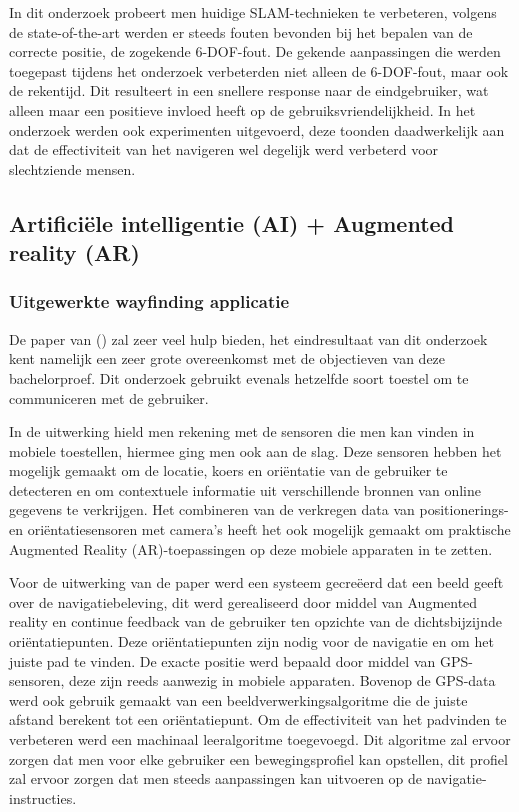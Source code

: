 In dit onderzoek probeert men huidige SLAM-technieken te verbeteren, volgens de state-of-the-art werden er steeds fouten bevonden bij het bepalen van de correcte positie, de zogekende 6-DOF-fout. De gekende aanpassingen die werden toegepast tijdens het onderzoek verbeterden niet alleen de 6-DOF-fout, maar ook de rekentijd. Dit resulteert in een snellere response naar de eindgebruiker, wat alleen maar een positieve invloed heeft op de gebruiksvriendelijkheid. In het onderzoek werden ook experimenten uitgevoerd, deze toonden daadwerkelijk aan dat de effectiviteit van het navigeren wel degelijk werd verbeterd voor slechtziende mensen.

\subsection{Artificiële intelligentie (AI) + Augmented reality (AR)}
\subsubsection{Uitgewerkte wayfinding applicatie}
De paper van \textcite{Pouria2016} () zal zeer veel hulp bieden, het eindresultaat van dit onderzoek kent namelijk een zeer grote overeenkomst met de objectieven van deze bachelorproef. Dit onderzoek gebruikt evenals hetzelfde soort toestel om te communiceren met de gebruiker.

In de uitwerking hield men rekening met de sensoren die men kan vinden in mobiele toestellen, hiermee ging men ook aan de slag. Deze sensoren hebben het mogelijk gemaakt om de locatie, koers en oriëntatie van de gebruiker te detecteren en om contextuele informatie uit verschillende bronnen van online gegevens te verkrijgen. Het combineren van de verkregen data van positionerings- en oriëntatiesensoren met camera's heeft het ook mogelijk gemaakt om praktische Augmented Reality (AR)-toepassingen op deze mobiele apparaten in te zetten. 

Voor de uitwerking van de paper werd een systeem gecreëerd dat een beeld geeft over de navigatiebeleving, dit werd gerealiseerd door middel van Augmented reality en continue feedback van de gebruiker ten opzichte van de dichtsbijzijnde oriëntatiepunten. Deze oriëntatiepunten zijn nodig voor de navigatie en om het juiste pad te vinden. De exacte positie werd bepaald door middel van GPS-sensoren, deze zijn reeds aanwezig in mobiele apparaten. Bovenop de GPS-data werd ook gebruik gemaakt van een beeldverwerkingsalgoritme die de juiste afstand berekent tot een oriëntatiepunt. Om de effectiviteit van het padvinden te verbeteren werd een machinaal leeralgoritme toegevoegd. Dit algoritme zal ervoor zorgen dat men voor elke gebruiker een bewegingsprofiel kan opstellen, dit profiel zal ervoor zorgen dat men steeds aanpassingen kan uitvoeren op de navigatie-instructies.

